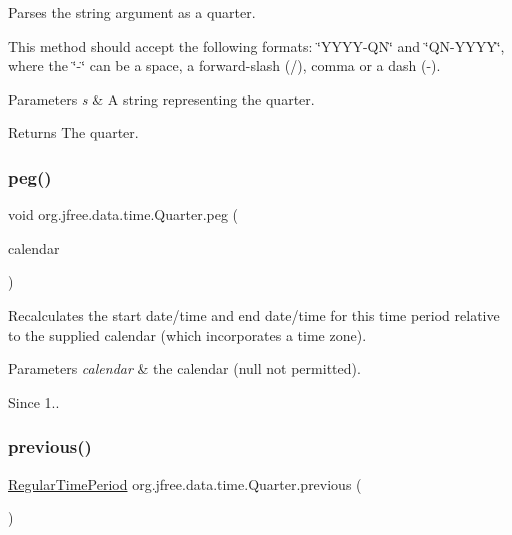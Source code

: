 Parses the string argument as a quarter. 

This method should accept the following formats\+: \char`\"{}\+Y\+Y\+Y\+Y-\/\+Q\+N\char`\"{} and \char`\"{}\+Q\+N-\/\+Y\+Y\+Y\+Y\char`\"{}, where the \char`\"{}-\/\char`\"{} can be a space, a forward-\/slash (/), comma or a dash (-\/). 
\begin{DoxyParams}{Parameters}
{\em s} & A string representing the quarter.\\
\hline
\end{DoxyParams}
\begin{DoxyReturn}{Returns}
The quarter. 
\end{DoxyReturn}
\mbox{\label{classorg_1_1jfree_1_1data_1_1time_1_1_quarter_a4977c326e2990b40052d09d935f11ce8}} 
\subsubsection{\texorpdfstring{peg()}{peg()}}
{\footnotesize\ttfamily void org.\+jfree.\+data.\+time.\+Quarter.\+peg (\begin{DoxyParamCaption}\item[{Calendar}]{calendar }\end{DoxyParamCaption})}

Recalculates the start date/time and end date/time for this time period relative to the supplied calendar (which incorporates a time zone).


\begin{DoxyParams}{Parameters}
{\em calendar} & the calendar ({\ttfamily null} not permitted).\\
\hline
\end{DoxyParams}
\begin{DoxySince}{Since}
1.. 
\end{DoxySince}
\mbox{\label{classorg_1_1jfree_1_1data_1_1time_1_1_quarter_a0ab654ab67dedb126e82c3330596f92e}} 
\subsubsection{\texorpdfstring{previous()}{previous()}}
{\footnotesize\ttfamily \mbox{\hyperlink{classorg_1_1jfree_1_1data_1_1time_1_1_regular_time_period}{Regular\+Time\+Period}} org.\+jfree.\+data.\+time.\+Quarter.\+previous (\begin{DoxyParamCaption}{ }\end{DoxyParamCaption})}

